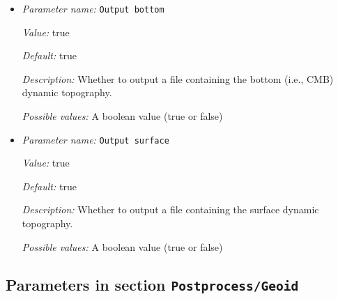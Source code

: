 \begin{itemize}
{\it Possible values:} A floating point number $v$ such that $0 \leq v \leq \text{MAX\_DOUBLE}$
\item {\it Parameter name:} {\tt Output bottom}
\label{parameters:Postprocess/Dynamic topography/Output bottom}
\label{parameters:Postprocess/Dynamic_20topography/Output_20bottom}


{\it Value:} true


{\it Default:} true


{\it Description:} Whether to output a file containing the bottom (i.e., CMB) dynamic topography.


{\it Possible values:} A boolean value (true or false)
\item {\it Parameter name:} {\tt Output surface}
\label{parameters:Postprocess/Dynamic topography/Output surface}
\label{parameters:Postprocess/Dynamic_20topography/Output_20surface}


{\it Value:} true


{\it Default:} true


{\it Description:} Whether to output a file containing the surface dynamic topography.


{\it Possible values:} A boolean value (true or false)
\end{itemize}

\subsection{Parameters in section \tt Postprocess/Geoid}
\label{parameters:Postprocess/Geoid}

